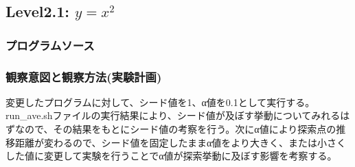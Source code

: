\subsection{Level2.1: $y=x^2$}
\subsubsection{プログラムソース}


\subsubsection{観察意図と観察方法(実験計画)}
変更したプログラムに対して、シード値を1、α値を0.1として実行する。run\_ave.shファイルの実行結果により、シード値が及ぼす挙動についてみれるはずなので、その結果をもとにシード値の考察を行う。次にα値により探索点の推移距離が変わるので、シード値を固定したままα値をより大きく、または小さくした値に変更して実験を行うことでα値が探索挙動に及ぼす影響を考察する。
